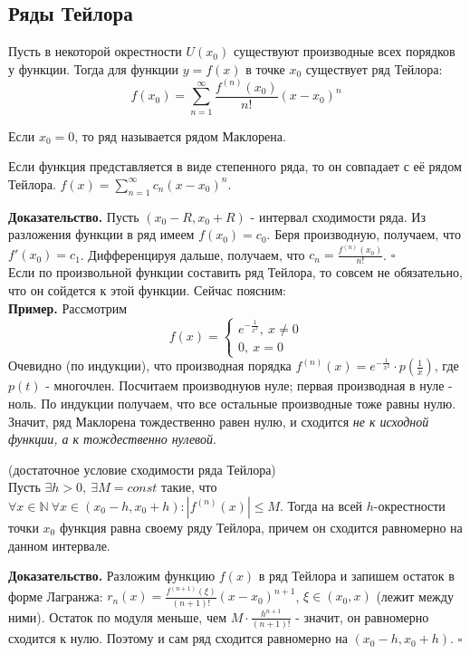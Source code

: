 \subsection{Ряды Тейлора}
\begin{defin}
Пусть в некоторой окрестности $U(x_0)$ существуют производные всех порядков
у функции. Тогда для функции $y=f(x)$ в точке $x_0$ существует ряд Тейлора:
$$f(x_0)=\sum\limits_{n=1}^{\infty} \frac{f^{(n)}(x_0)}{n!}(x-x_0)^n$$
\end{defin}
Если $x_0=0$, то ряд называется рядом Маклорена.
\begin{theor}
Если функция представляется в виде степенного ряда, то он совпадает с 
её рядом Тейлора. $f(x)=\sum\limits_{n=1}^{\infty} c_n(x-x_0)^n$.
\end{theor}
\textbf{Доказательство.}  Пусть $(x_0-R,x_0+R)$ - интервал сходимости ряда. 
Из разложения функции в ряд имеем  $f(x_0)=c_0$. Беря производную, получаем,
что  $f'(x_0)=c_1$. Дифференцируя дальше, получаем, что  $c_n=
\frac{f^{(n)}(x_0)}{n!}$. $\square$ \\
Если по произвольной функции составить ряд Тейлора, то совсем не обязательно,
что он сойдется к этой функции. Сейчас поясним:\\
\textbf{Пример.} Рассмотрим
$$f(x)=\begin{cases}
    e^{-\frac{1}{x^2}},~x\ne0\\0,~x=0    
\end{cases}$$
Очевидно (по индукции), что производная порядка $f^{(n)}(x)=e^{-\frac{1}{x^2}}
\cdot p\left( \frac{1}{x} \right)$, где $p(t)$ - многочлен. Посчитаем
производнуюв нуле; первая производная в нуле - ноль. По индукции получаем,
что все остальные производные тоже равны нулю. Значит, ряд Маклорена 
тождественно равен нулю, и сходится \textit{не к исходной функции, а
к тождественно нулевой}.
 \begin{theor}
     (достаточное условие сходимости ряда Тейлора)\\
Пусть $\exists h>0,~\exists M=const$ такие, что $\forall x\in \mathbb{N}~
\forall x\in(x_0-h,x_0+h): |f^{(n)}(x)|\leqslant M$. Тогда на всей
$h$-окрестности точки $x_0$ функция равна своему ряду Тейлора, 
причем он сходится равномерно на данном интервале. 
\end{theor}
\textbf{Доказательство.}  Разложим функцию $f(x)$ в ряд Тейлора и запишем  
остаток в форме Лагранжа: $r_n(x)=\frac{f^{(n+1)}(\xi)}{(n+1)!}(x-x_0)^{n+1}$,
$\xi\in(x_0,x)$ (лежит между ними).  Остаток по модуля меньше, чем
$M\cdot \frac{h^{n+1}}{(n+1)!}$ - значит, он равномерно сходится к нулю. 
Поэтому и сам ряд сходится равномерно на $(x_0-h,x_0+h)$. $\square$ 
